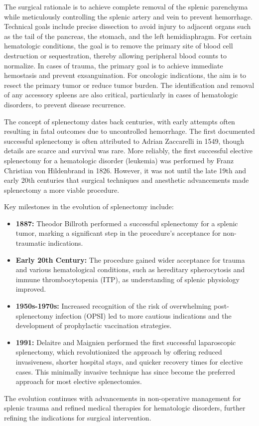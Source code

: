 The surgical rationale is to achieve complete removal of the splenic parenchyma while meticulously controlling the splenic artery and vein to prevent hemorrhage. Technical goals include precise dissection to avoid injury to adjacent organs such as the tail of the pancreas, the stomach, and the left hemidiaphragm. For certain hematologic conditions, the goal is to remove the primary site of blood cell destruction or sequestration, thereby allowing peripheral blood counts to normalize. In cases of trauma, the primary goal is to achieve immediate hemostasis and prevent exsanguination. For oncologic indications, the aim is to resect the primary tumor or reduce tumor burden. The identification and removal of any accessory spleens are also critical, particularly in cases of hematologic disorders, to prevent disease recurrence.

The concept of splenectomy dates back centuries, with early attempts often resulting in fatal outcomes due to uncontrolled hemorrhage. The first documented successful splenectomy is often attributed to Adrian Zaccarelli in 1549, though details are scarce and survival was rare. More reliably, the first successful elective splenectomy for a hematologic disorder (leukemia) was performed by Franz Christian von Hildenbrand in 1826. However, it was not until the late 19th and early 20th centuries that surgical techniques and anesthetic advancements made splenectomy a more viable procedure.

Key milestones in the evolution of splenectomy include:
\begin{itemize}
  \item \textbf{1887:} Theodor Billroth performed a successful splenectomy for a splenic tumor, marking a significant step in the procedure's acceptance for non-traumatic indications.
  \item \textbf{Early 20th Century:} The procedure gained wider acceptance for trauma and various hematological conditions, such as hereditary spherocytosis and immune thrombocytopenia (ITP), as understanding of splenic physiology improved.
  \item \textbf{1950s-1970s:} Increased recognition of the risk of overwhelming post-splenectomy infection (OPSI) led to more cautious indications and the development of prophylactic vaccination strategies.
  \item \textbf{1991:} Delaitre and Maignien performed the first successful laparoscopic splenectomy, which revolutionized the approach by offering reduced invasiveness, shorter hospital stays, and quicker recovery times for elective cases. This minimally invasive technique has since become the preferred approach for most elective splenectomies.
\end{itemize}
The evolution continues with advancements in non-operative management for splenic trauma and refined medical therapies for hematologic disorders, further refining the indications for surgical intervention.

